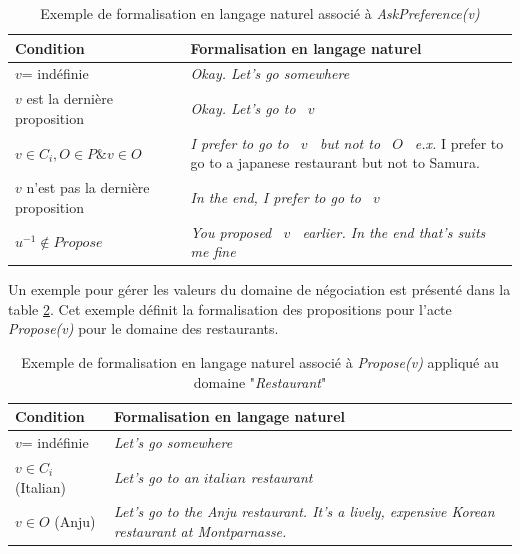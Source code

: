 			\begin{table} [h]
				\centering
				\begin{tabular} {p{4cm}| p{6.5cm}}
					\hline
					\hline
					Condition & Formalisation en langage naturel \\
					\hline
					$v$= indéfinie & \textit{Okay. Let's go somewhere} \\
					\hline
					$ v $ est la dernière proposition  & \textit{Okay. Let's go to \ $v$ \ } \\
					\hline
					 $ v \in C_i,  O \in P  \& v \in O$ & \textit{I prefer to go to \ $v$ \, but not to \ $O$\ }
															\newline \emph{e.x.} I prefer to go to a japanese restaurant but not to Samura. \\
					\hline
					$ v $ n'est pas la dernière proposition & \textit{In the end, I prefer to go to  \ $v$ \ } \\
					\hline
					$u^{-1} \not \in Propose$ & \textit{You proposed  \ $v$ \ earlier. In the end that's suits me fine} \\
					\hline
					\hline
				\end{tabular}
				\caption{\label{tab:AcceptEx} Exemple de formalisation en langage naturel associé à \emph{AskPreference(v)}}
			\end{table}
			
			Un exemple pour gérer les valeurs du domaine de négociation est présenté dans la table \ref{tab:ProposeEx}. Cet exemple définit la formalisation des propositions pour l'acte \emph{Propose(v)} pour le domaine des restaurants.
					\begin{table} [h]
						\centering
						\begin{tabular} {p{3.5cm} p{7cm}}
							\hline
							\hline
							Condition & Formalisation en langage naturel \\
							\hline
							$v$= indéfinie & \textit{Let's go somewhere } \\
							\hline
							$ v \in C_i$ (Italian)  & \textit{Let's go to an $italian$ restaurant} \\
							\hline
							$v \in O$ (Anju) & \textit{Let's go to the Anju restaurant. It's a lively, expensive Korean restaurant at Montparnasse.}\\
							\hline
							\hline
						\end{tabular}
						\caption{\label{tab:ProposeEx} Exemple de formalisation en langage naturel associé à \emph{Propose(v)} appliqué au domaine "\textit{Restaurant}"}
					\end{table}
	
